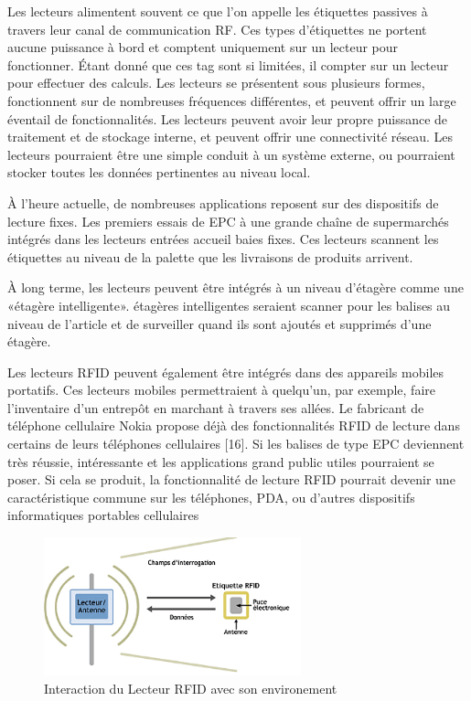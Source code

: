 \documentclass[11pt, a4paper, twoside]{book}
\begin{document}
Les lecteurs alimentent souvent ce que l'on appelle les étiquettes passives à travers leur canal de communication RF.
Ces types d'étiquettes ne portent aucune puissance à bord et comptent uniquement sur un lecteur pour fonctionner. Étant donné que ces tag sont si limitées, il compter sur un lecteur pour effectuer des calculs.
Les lecteurs se présentent sous plusieurs formes, fonctionnent sur de nombreuses fréquences différentes, et peuvent offrir un large éventail de fonctionnalités. Les lecteurs peuvent avoir leur propre puissance de traitement et de stockage interne, et peuvent offrir une connectivité réseau. Les lecteurs pourraient être une simple conduit à un système externe, ou pourraient stocker toutes les données pertinentes au niveau local.

À l'heure actuelle, de nombreuses applications reposent sur des dispositifs de lecture fixes. Les premiers essais de EPC à une grande chaîne de supermarchés intégrés dans les lecteurs entrées accueil baies fixes. Ces lecteurs scannent les étiquettes au niveau de la palette que les livraisons de produits arrivent. 

À long terme, les lecteurs peuvent être intégrés à un niveau d'étagère comme une «étagère intelligente». étagères intelligentes seraient scanner pour les balises au niveau de l'article et de surveiller quand ils sont ajoutés et supprimés d'une étagère.

Les lecteurs RFID peuvent également être intégrés dans des appareils mobiles portatifs. Ces lecteurs mobiles permettraient à quelqu'un, par exemple, faire l'inventaire d'un entrepôt en marchant à travers ses allées. Le fabricant de téléphone cellulaire Nokia propose déjà des fonctionnalités RFID de lecture dans certains de leurs téléphones cellulaires [16]. Si les balises de type EPC deviennent très réussie, intéressante et les applications grand public utiles pourraient se poser. Si cela se produit, la fonctionnalité de lecture RFID pourrait devenir une caractéristique commune sur les téléphones, PDA, ou d'autres dispositifs informatiques portables cellulaires
\begin{figure}[h!]
\centering
\includegraphics[height=4cm]{reader}
\caption{Interaction du Lecteur RFID avec son environement}
\end{figure}
\end{document}
